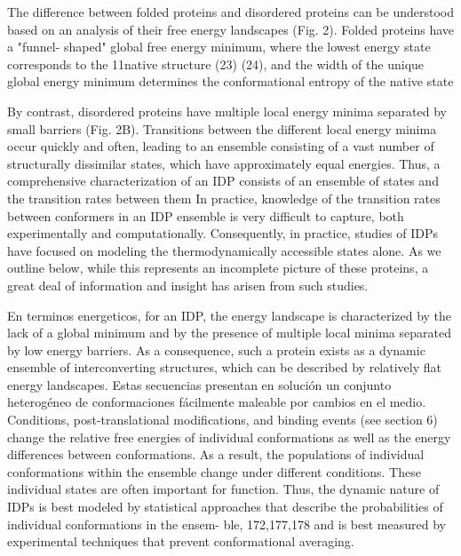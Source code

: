 The difference between folded proteins and disordered proteins can be understood based
on an analysis of their free energy landscapes (Fig. 2).
Folded proteins have a "funnel-
shaped" global free energy minimum, where the lowest energy state corresponds to the
11native structure (23) (24), and the width of the unique global energy minimum
determines the conformational entropy of the native state

By contrast,
disordered proteins have multiple local energy minima separated by small barriers (Fig.
2B). Transitions between the different local energy minima occur quickly and often,
leading to an ensemble consisting of a vast number of structurally dissimilar states,
which have approximately equal energies. Thus, a comprehensive characterization of an
IDP consists of an ensemble of states and the transition rates between them
In
practice, knowledge of the transition rates between conformers in an IDP ensemble is
very difficult to capture, both experimentally and computationally.
Consequently, in
practice, studies of IDPs have focused on modeling the thermodynamically accessible
states alone. As we outline below, while this represents an incomplete picture of these
proteins, a great deal of information and insight has arisen from such studies.

En terminos energeticos, for an IDP, the energy landscape is characterized by the lack of a global minimum and by the presence of multiple local minima separated by low energy barriers. 
As a consequence, such a protein exists as a dynamic ensemble of interconverting structures, which can be described by relatively flat energy landscapes.
Estas secuencias presentan en solución un conjunto heterogéneo de conformaciones fácilmente maleable por cambios en el medio. 
Conditions, post-translational modifications,
and binding events (see section 6) change the relative free
energies of individual conformations as well as the energy
differences between conformations.
As a result, the
populations of individual conformations within the ensemble
change under different conditions. These individual states are
often important for function. Thus, the dynamic nature of IDPs is
best modeled by statistical approaches that describe the
probabilities of individual conformations in the ensem-
ble, 172,177,178 and is best measured by experimental techniques
that prevent conformational averaging.


